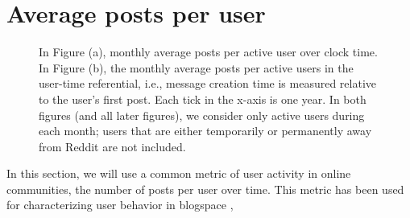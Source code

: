 
\section{Average posts per user}

\begin{figure*}[!tb]
\centering
{}
\caption{In Figure (a), monthly average posts per active user over clock time. In Figure (b), the monthly average posts per active users in the user-time referential, i.e., message creation time is measured relative to the user's first post.  Each tick in the x-axis is one year.  In both figures (and all later figures), we consider only active users during each month; users that are either temporarily or permanently away from Reddit are not included.}
\label{fig:overall_posts}
\end{figure*}

In this section, we will use a common metric of user activity in online communities, the number of posts per user over time.  This metric has been used for characterizing user behavior in blogspace \cite{Gruhl2004}, 


